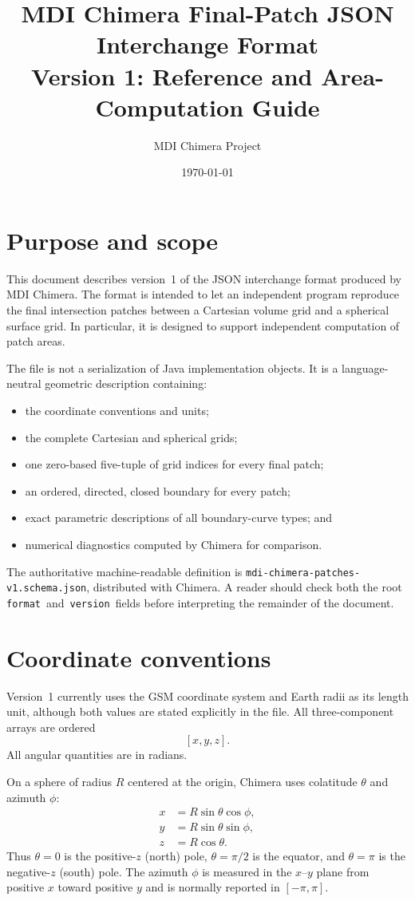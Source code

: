 \documentclass[11pt]{article}
\title{MDI Chimera Final-Patch JSON Interchange Format\\
       \large Version 1: Reference and Area-Computation Guide}
\author{MDI Chimera Project}
\date{\today}
\newcommand{\field}[1]{\texttt{#1}}
\begin{document}
\maketitle
\tableofcontents
\newpage

\section{Purpose and scope}

This document describes version~1 of the JSON interchange format produced by
MDI Chimera.  The format is intended to let an independent program reproduce
the final intersection patches between a Cartesian volume grid and a spherical
surface grid.  In particular, it is designed to support independent computation
of patch areas.

The file is not a serialization of Java implementation objects.  It is a
language-neutral geometric description containing:

\begin{itemize}[nosep]
  \item the coordinate conventions and units;
  \item the complete Cartesian and spherical grids;
  \item one zero-based five-tuple of grid indices for every final patch;
  \item an ordered, directed, closed boundary for every patch;
  \item exact parametric descriptions of all boundary-curve types; and
  \item numerical diagnostics computed by Chimera for comparison.
\end{itemize}

The authoritative machine-readable definition is
\field{mdi-chimera-patches-v1.schema.json}, distributed with Chimera.  A reader
should check both the root \,\field{format}\, and \,\field{version}\, fields before
interpreting the remainder of the document.

\section{Coordinate conventions}

Version~1 currently uses the GSM coordinate system and Earth radii as its
length unit, although both values are stated explicitly in the file.  All
three-component arrays are ordered
\[
  [x,y,z].
\]
All angular quantities are in radians.

On a sphere of radius $R$ centered at the origin, Chimera uses colatitude
$\theta$ and azimuth $\phi$:
\begin{align}
  x &= R\sin\theta\cos\phi,\\
  y &= R\sin\theta\sin\phi,\\
  z &= R\cos\theta.
\end{align}
Thus $\theta=0$ is the positive-$z$ (north) pole, $\theta=\pi/2$ is the
equator, and $\theta=\pi$ is the negative-$z$ (south) pole.  The azimuth $\phi$
is measured in the $x$--$y$ plane from positive $x$ toward positive $y$ and is
normally reported in $[-\pi,\pi]$.
\end{document}
